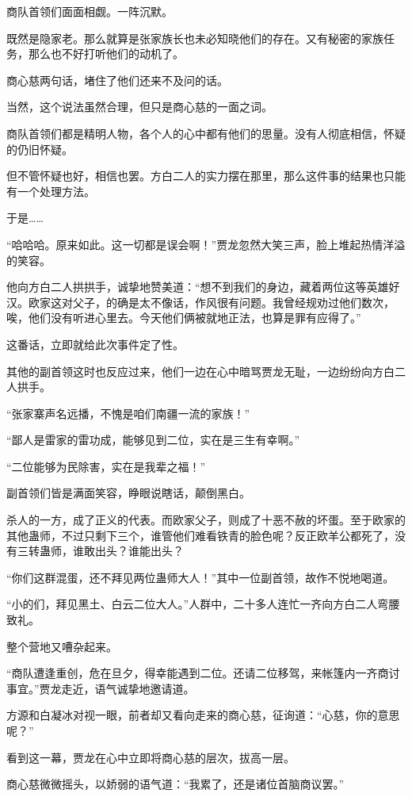 \begin{this_body}
商队首领们面面相觑。一阵沉默。

既然是隐家老。那么就算是张家族长也未必知晓他们的存在。又有秘密的家族任务，那么也不好打听他们的动机了。

商心慈两句话，堵住了他们还来不及问的话。

当然，这个说法虽然合理，但只是商心慈的一面之词。

商队首领们都是精明人物，各个人的心中都有他们的思量。没有人彻底相信，怀疑的仍旧怀疑。

但不管怀疑也好，相信也罢。方白二人的实力摆在那里，那么这件事的结果也只能有一个处理方法。

于是……

“哈哈哈。原来如此。这一切都是误会啊！”贾龙忽然大笑三声，脸上堆起热情洋溢的笑容。

他向方白二人拱拱手，诚挚地赞美道：“想不到我们的身边，藏着两位这等英雄好汉。欧家这对父子，的确是太不像话，作风很有问题。我曾经规劝过他们数次，唉，他们没有听进心里去。今天他们俩被就地正法，也算是罪有应得了。”

这番话，立即就给此次事件定了性。

其他的副首领这时也反应过来，他们一边在心中暗骂贾龙无耻，一边纷纷向方白二人拱手。

“张家寨声名远播，不愧是咱们南疆一流的家族！”

“鄙人是雷家的雷功成，能够见到二位，实在是三生有幸啊。”

“二位能够为民除害，实在是我辈之福！”

副首领们皆是满面笑容，睁眼说瞎话，颠倒黑白。

杀人的一方，成了正义的代表。而欧家父子，则成了十恶不赦的坏蛋。至于欧家的其他蛊师，不过只剩下三个，谁管他们难看铁青的脸色呢？反正欧羊公都死了，没有三转蛊师，谁敢出头？谁能出头？

“你们这群混蛋，还不拜见两位蛊师大人！”其中一位副首领，故作不悦地喝道。

“小的们，拜见黑土、白云二位大人。”人群中，二十多人连忙一齐向方白二人弯腰致礼。

整个营地又嘈杂起来。

“商队遭逢重创，危在旦夕，得幸能遇到二位。还请二位移驾，来帐篷内一齐商讨事宜。”贾龙走近，语气诚挚地邀请道。

方源和白凝冰对视一眼，前者却又看向走来的商心慈，征询道：“心慈，你的意思呢？”

看到这一幕，贾龙在心中立即将商心慈的层次，拔高一层。

商心慈微微摇头，以娇弱的语气道：“我累了，还是诸位首脑商议罢。”


\end{this_body}
